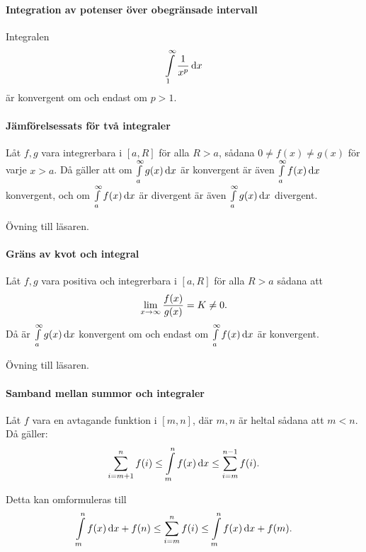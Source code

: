 \paragraph{Integration av potenser över obegränsade intervall}
Integralen
\begin{align*}
	\int\limits_{1}^{\infty}\frac{1}{x^p}\dd{x}
\end{align*}
är konvergent om och endast om $p > 1$.

\proof

\paragraph{Jämförelsessats för två integraler}
Låt $f, g$ vara integrerbara i $[a, R]$ för alla $R > a$, sådana $0\neq f(x)\neq g(x)$ för varje $x > a$. Då gäller att om $\int\limits_{a}^{\infty}g(x)\dd{x}$ är konvergent är även $\int\limits_{a}^{\infty}f(x)\dd{x}$ konvergent, och om $\int\limits_{a}^{\infty}f(x)\dd{x}$ är divergent är även $\int\limits_{a}^{\infty}g(x)\dd{x}$ divergent.

\proof
Övning till läsaren.

\paragraph{Gräns av kvot och integral}
Låt $f, g$ vara positiva och integrerbara i $[a, R]$ för alla $R > a$ sådana att
\begin{align*}
	\lim\limits_{x\to \infty}\frac{f(x)}{g(x)} = K\neq 0.
\end{align*}
Då är $\int\limits_{a}^{\infty}g(x)\dd{x}$ konvergent om och endast om $\int\limits_{a}^{\infty}f(x)\dd{x}$ är konvergent.

\proof
Övning till läsaren.

\paragraph{Samband mellan summor och integraler}
Låt $f$ vara en avtagande funktion i $[m, n]$, där $m, n$ är heltal sådana att $m < n$. Då gäller:
\begin{align*}
	\sum\limits_{i = m + 1}^{n}f(i)\leq \int\limits_{m}^{n}f(x)\dd{x}\leq \sum\limits_{i = m}^{n - 1}f(i).
\end{align*}

Detta kan omformuleras till
\begin{align*}
	\int\limits_{m}^{n}f(x)\dd{x} + f(n)\leq \sum\limits_{i = m}^{n}f(i)\leq \int\limits_{m}^{n}f(x)\dd{x} + f(m).
\end{align*}

